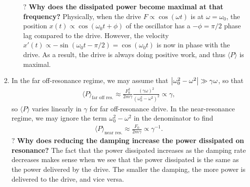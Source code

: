 \documentclass{article}
\theoremstyle{definition}
\newcommand{\f}[2]{\frac{#1}{#2}}
\begin{document}
\begin{enumerate}[label= \alph*)]
\begin{enumerate}[label=\roman*)]
	
	$\boxed{\textbf{?}}$ \textbf{Why does the dissipated power become maximal at that frequency? } Physically, when the drive $F \propto \cos (\omega t)$ is at $\omega = \omega_0$, the position $x(t) \propto \cos(\omega_0 t + \phi)$ of the oscillator has a $-\phi =\pi/2$ phase lag compared to the drive. However, the velocity $x'(t) \propto -\sin(\omega_0 t -\pi/2) = \cos(\omega_0 t)$ is now in phase with the drive. As a result, the drive is always doing positive work, and thus $\langle P \rangle$ is maximal.  
	
	
	\end{enumerate}
	
	\item In the far off-resonance regime, we may assume that $\abs{\omega_0^2 - \omega^2}\gg \gamma \omega$, so that 
	\begin{align*}
	\langle P \rangle_\text{far off res.}  \approx   \f{F_0^2}{2m\gamma} \f{(\gamma \omega)^2}{(\omega_0^2 - \omega^2)^2} \propto \gamma,
	\end{align*}
	so $\langle P \rangle$ varies linearly in $\gamma$ for far off-resonance drive. In the near-resonance regime, we may ignore the term $\omega_0^2 - \omega^2$ in the denominator to find 
	\begin{align*}
	\langle P \rangle_\text{near res.} \approx \f{F_0}{2m\gamma} \propto \gamma^{-1}.
	\end{align*}
	$\boxed{\textbf{?}}$ \textbf{Why does reducing the damping increase the power dissipated on resonance?} The fact that the power dissipated increases as the damping rate decreases makes sense when we see that the power dissipated is the same as the power delivered by the drive.  The smaller the damping, the more power is delivered to the drive, and vice versa. 
	

\end{enumerate}
\end{document}

